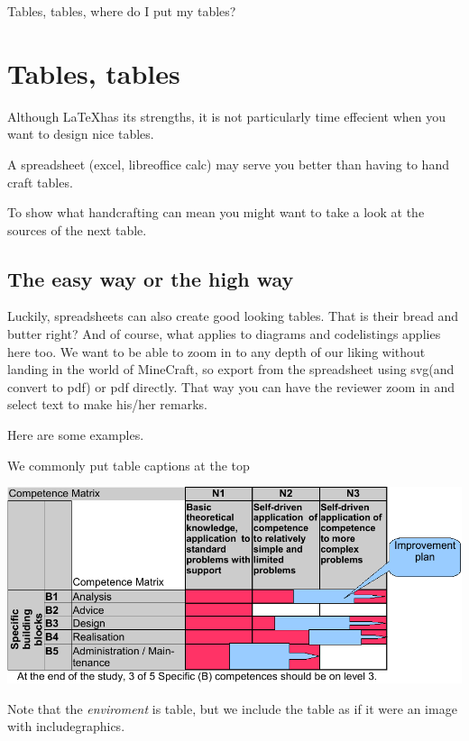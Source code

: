 
\begin{savequote}[15cm]
  \raggedleft
  \sffamily
  Tables, tables, where do I put my tables?
\end{savequote}
\chapter{Tables, tables}

Although \LaTeX has its strengths, it is not particularly time effecient when you want to design nice tables.

A spreadsheet (excel, libreoffice calc) may serve you better than having to hand craft tables.

To show what handcrafting can mean you might want to take a look at the sources of the next table.



\section{The easy way or the high way}

Luckily, spreadsheets can also create good looking tables. That is their bread and butter right?
And of course, what applies to diagrams and codelistings applies here too. We want to be able to zoom in to any depth
of our liking without landing in the world of MineCraft, so export from the spreadsheet using svg(and convert to pdf) or pdf directly. That way you can have the reviewer zoom in and select text to make his/her remarks.

Here are some examples.

\begin{table}
  \caption{We commonly put table captions at the top}
\includegraphics{tables/matrixExample-crop.pdf}   
\end{table}

Note that the \textit{enviroment} is table, but we include the table as if it were an image with includegraphics.

